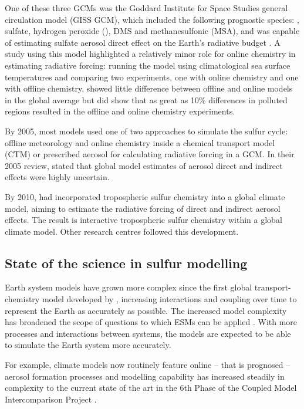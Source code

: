 One of these three GCMs was the Goddard Institute for Space Studies general circulation model (GISS GCM), which included the following prognostic species: , sulfate, hydrogen peroxide (), DMS and methanesulfonic (MSA), and was capable of estimating sulfate aerosol direct effect on the Earth’s radiative budget \citep{kochTroposphericSulfurSimulation1999}. A study using this model highlighted a relatively minor role for online chemistry in estimating radiative forcing: running the model using climatological sea surface temperatures and comparing two experiments, one with online chemistry and one with offline chemistry, showed little difference between offline and online models in the global average but did show that as great as 10\% differences in polluted regions resulted in the offline and online chemistry experiments.

By 2005, most models used one of two approaches to simulate the sulfur cycle: offline meteorology and online chemistry inside a chemical transport model (CTM) or prescribed aerosol for calculating radiative forcing in a GCM.  In their 2005 review, \citet{lohmannGlobalIndirectAerosol2005} stated that global model estimates of aerosol direct and indirect effects were highly uncertain. 

By 2010, \citet{tsaiSulfurCycleSulfate2010} had incorporated tropospheric sulfur chemistry into a global climate model, aiming to estimate the radiative forcing of direct and indirect aerosol effects. The result is interactive tropospheric sulfur chemistry within a global climate model. Other research centres followed this development.


\subsection{State of the science in sulfur modelling}
\label{ch1:sec:current-modelling-cmip6}


Earth system models have grown more complex since the first global transport-chemistry model developed by \citet{langnerGlobalThreedimensionalModel1991}, increasing interactions and coupling over time to represent the Earth as accurately as possible. The increased model complexity has broadened the scope of questions to which ESMs can be applied \citep{flatoEarthSystemModels2011}. With more processes and interactions between systems, the models are expected to be able to simulate the Earth system more accurately. 

For example, climate models now routinely feature online -- that is prognosed -- aerosol formation processes and modelling capability has increased steadily in complexity to the current state of the art in the 6th Phase of the Coupled Model Intercomparison Project \citep[CMIP6, details in next section;][]{eyringOverviewCoupledModel2016}. 


